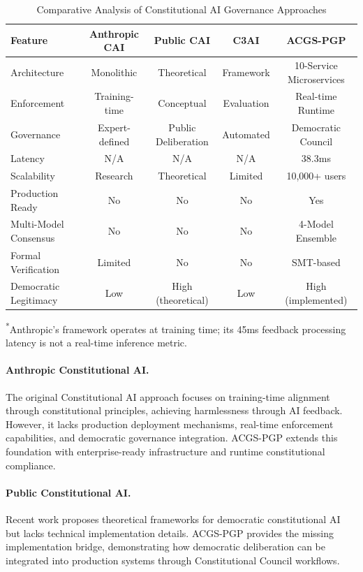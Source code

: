 \documentclass[manuscript,screen,9pt]{acmart}
\newcommand{\tablesize}{\footnotesize}
\begin{document}
\begin{table}[ht]
\centering
\caption{Comparative Analysis of Constitutional AI Governance Approaches}
\label{tab:competitive_comparison}
\tablesize
\begin{tabular}{@{}lcccc@{}}
\toprule
\textbf{Feature} & \textbf{Anthropic CAI} & \textbf{Public CAI} & \textbf{C3AI} & \textbf{ACGS-PGP} \\
\midrule
Architecture & Monolithic & Theoretical & Framework & 10-Service Microservices \\
Enforcement & Training-time & Conceptual & Evaluation & Real-time Runtime \\
Governance & Expert-defined & Public Deliberation & Automated & Democratic Council \\
Latency & N/A & N/A & N/A & 38.3ms \\
Scalability & Research & Theoretical & Limited & 10,000+ users \\
Production Ready & No & No & No & Yes \\
Multi-Model Consensus & No & No & No & 4-Model Ensemble \\
Formal Verification & Limited & No & No & SMT-based \\
Democratic Legitimacy & Low & High (theoretical) & Low & High (implemented) \\
\bottomrule
\end{tabular}
\begin{minipage}{\linewidth}\footnotesize \textsuperscript{*}Anthropic's framework operates at training time; its 45ms feedback processing latency is not a real-time inference metric.\end{minipage}
\end{table}

\paragraph{Anthropic Constitutional AI.} The original Constitutional AI approach \citep{Bai2025ConstitutionalAI} focuses on training-time alignment through constitutional principles, achieving harmlessness through AI feedback. However, it lacks production deployment mechanisms, real-time enforcement capabilities, and democratic governance integration. ACGS-PGP extends this foundation with enterprise-ready infrastructure and runtime constitutional compliance.

\paragraph{Public Constitutional AI.} Recent work \citep{Abiri2024PublicConstitutionalAI} proposes theoretical frameworks for democratic constitutional AI but lacks technical implementation details. ACGS-PGP provides the missing implementation bridge, demonstrating how democratic deliberation can be integrated into production systems through Constitutional Council workflows.
\end{document}
